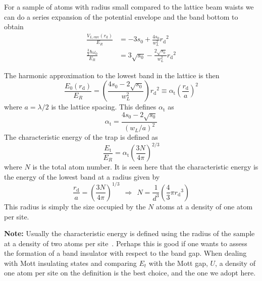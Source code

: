 \documentclass[11pt,letter]{article}
\newcommand{\rdiag}{\ensuremath{ r_{\text{d}} } }
\begin{document}

For a sample of atoms with radius small compared to the lattice beam waists
we can do a series expansion of the  potential envelope and the band bottom to
obtain
\begin{equation}
\begin{split}
    \frac{ V_{L,\text{env}}( \rdiag ) }{ E_{R} }  & =   
        -3 s_{0}  + \frac{ 4 s_{0} }{w_{L}^{2}} \rdiag^{2}  \\
    \frac{ \frac{3}{2}\hbar \omega_{0} }{ E_{R} } & = 
        3 \sqrt{ s_{0}} - \frac{ 2 \sqrt{s_{0}}}{w_{L}^{2}} \rdiag^{2} 
\end{split}
\label{eq:lattice-expand-harmonic}
\end{equation}

The harmonic approximation to the lowest band in the lattice is then 
\begin{equation} 
   \frac{ E_{0}(\rdiag) }{E_{R} }  = 
       \left(\frac{ 4 s_{0} - 2 \sqrt{ s_{0} } }{ w_{L}^{2} } \right)\rdiag^{2} 
       \equiv  \alpha_{\text{t}}  \left( \frac{ \rdiag}{a} \right)^{2}
\end{equation}
where $a=\lambda/2$ is the lattice spacing.  This defines $\alpha_{\text{t}}$
as 
\begin{equation}
 \alpha_{\text{t}} =  \frac{ 4s_{0} - 2\sqrt{s_{0}}}{ (w_{L}/a)^{2} } 
\end{equation}
The characteristic energy of the trap is defined as
\begin{equation} 
  \frac{ E_{\text{t}} }{E_{R}} =  \alpha_{\text{t}} \left(  \frac{ 3N }{ 4\pi }
\right)^{2/3}
\label{eq:characteristic-energy} 
\end{equation}
where $N$ is the total atom number.  It is seen here that the characteristic
energy is the energy of the lowest band at a radius given by 
\begin{equation}
  \frac{ \rdiag }{ a } =  \left( \frac{ 3N }{ 4 \pi} \right)^{1/3}
  \ \ \Rightarrow   \ \ 
  N = \frac{1}{d^{3}} \left(   \frac{4}{3} \pi \rdiag^{3}  \right)
\end{equation}
This radius is simply the size occupied by the $N$ atoms at a density of one
atom per site.  

 
\textbf{Note:} Usually the characteristic energy is defined using the radius of
the sample at a density of two atoms per site~\cite{Schneider2010}.  Perhaps
this is good if one wants to assess the formation of a band insulator with
respect to the band gap.   When dealing with Mott insulating states and
comparing $E_{t}$ with the Mott gap, $U$, a density of one atom per site on the
definition is the best choice, and the one we adopt here.  
\end{document}
